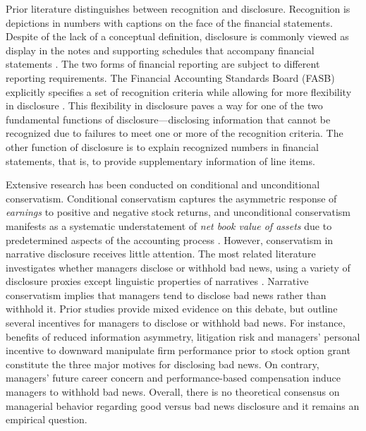\documentclass[a4paper]{article}
\begin{document}
\begin{spacing}{2}
Prior literature distinguishes between recognition and disclosure. Recognition is depictions in numbers with captions on the face of the financial statements. Despite of the lack of a conceptual definition, disclosure is commonly viewed as display in the notes and supporting schedules that accompany financial statements \citep*{schipperRequiredDisclosuresFinancial2007}. The two forms of financial reporting are subject to different reporting requirements. The Financial Accounting Standards Board (FASB) explicitly specifies a set of recognition criteria while allowing for more flexibility in disclosure \citep*{fasbStatementFinancialAccounting1984}. This flexibility in disclosure paves a way for one of the two fundamental functions of disclosure---disclosing information that cannot be recognized due to failures to meet one or more of the recognition criteria. The other function of disclosure is to explain recognized numbers in financial statements, that is, to provide supplementary information of line items. 

Extensive research has been conducted on conditional and unconditional conservatism. Conditional conservatism captures the asymmetric response of \textit{earnings} to positive and negative stock returns, and unconditional conservatism manifests as a systematic understatement of \textit{net book value of assets} due to predetermined aspects of the accounting process \citep[e.g.,][]{beaverConditionalUnconditionalConservatism2005}. However, conservatism in narrative disclosure receives little attention. The most related literature investigates whether managers disclose or withhold bad news, using a variety of disclosure proxies except linguistic properties of narratives \citep*{baoManagersDiscloseWithhold2019, kothariManagersWithholdBad2009, skinnerWhyFirmsVoluntarily1994, skinnerEarningsDisclosuresStockholder1997}. Narrative conservatism implies that managers tend to disclose bad news rather than withhold it. Prior studies provide mixed evidence on this debate, but outline several incentives for managers to disclose or withhold bad news. For instance, benefits of reduced information asymmetry, litigation risk and managers' personal incentive to downward manipulate firm performance prior to stock option grant constitute the three major motives for disclosing bad news. On contrary, managers' future career concern and performance-based compensation induce managers to withhold bad news. Overall, there is no theoretical consensus on managerial behavior regarding good versus bad news disclosure and it remains an empirical question.


\end{spacing}
\end{document}
